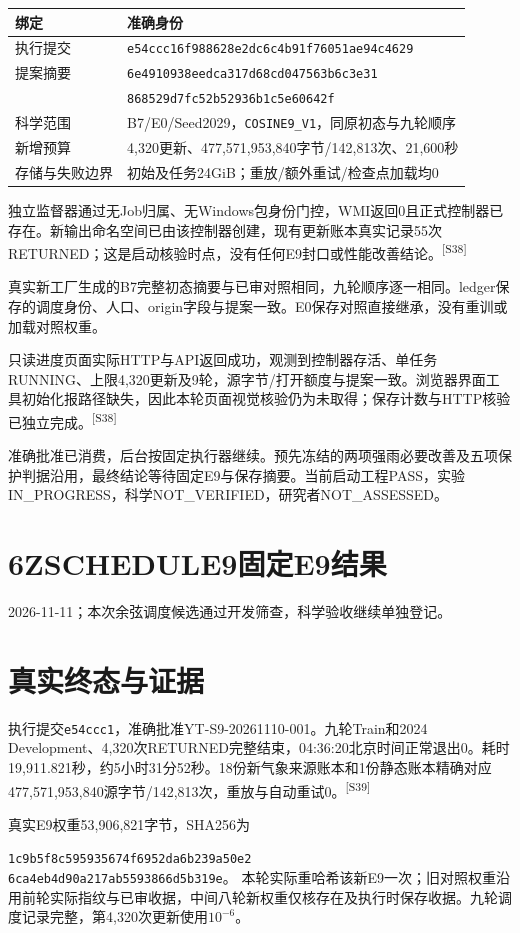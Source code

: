 \documentclass[UTF8,10.5pt,a4paper,fontset=none]{ctexart}
\newcommand{\evi}[1]{\textsuperscript{\color{muted}[#1]}}
\newcommand{\pageheading}[2]{\clearpage\section*{#1}\textcolor{muted}{#2}\par\vspace{3pt}}
\begin{document}
\begin{tabularx}{\textwidth}{@{}p{34mm}X@{}}
\toprule 绑定 & 准确身份\\\midrule
执行提交 & \texttt{e54ccc16f988628e2dc6c4b91f76051ae94c4629}\\
提案摘要 & \texttt{6e4910938eedca317d68cd047563b6c3e31}\\
 & \texttt{868529d7fc52b52936b1c5e60642f}\\
科学范围 & B7/E0/Seed2029，\texttt{COSINE9\_V1}，同原初态与九轮顺序\\
新增预算 & 4,320更新、477,571,953,840字节/142,813次、21,600秒\\
存储与失败边界 & 初始及任务24GiB；重放/额外重试/检查点加载均0\\
\bottomrule
\end{tabularx}

独立监督器通过无Job归属、无Windows包身份门控，WMI返回0且正式控制器已存在。新输出命名空间已由该控制器创建，现有更新账本真实记录55次RETURNED；这是启动核验时点，没有任何E9封口或性能改善结论。\evi{S38}

真实新工厂生成的B7完整初态摘要与已审对照相同，九轮顺序逐一相同。ledger保存的调度身份、人口、origin字段与提案一致。E0保存对照直接继承，没有重训或加载对照权重。

只读进度页面实际HTTP与API返回成功，观测到控制器存活、单任务RUNNING、上限4,320更新及9轮，源字节/打开额度与提案一致。浏览器界面工具初始化报路径缺失，因此本轮页面视觉核验仍为未取得；保存计数与HTTP核验已独立完成。\evi{S38}

准确批准已消费，后台按固定执行器继续。预先冻结的两项强雨必要改善及五项保护判据沿用，最终结论等待固定E9与保存摘要。当前启动工程PASS，实验IN\_PROGRESS，科学NOT\_VERIFIED，研究者NOT\_ASSESSED。

\pageheading{6Z\quad SCHEDULE9固定E9结果}{2026-11-11；本次余弦调度候选通过开发筛查，科学验收继续单独登记。}
\section*{真实终态与证据}
执行提交\texttt{e54ccc1}，准确批准YT-S9-20261110-001。九轮Train和2024 Development、4,320次RETURNED完整结束，04:36:20北京时间正常退出0。耗时19,911.821秒，约5小时31分52秒。18份新气象来源账本和1份静态账本精确对应477,571,953,840源字节/142,813次，重放与自动重试0。\evi{S39}

真实E9权重53,906,821字节，SHA256为\par
\texttt{1c9b5f8c595935674f6952da6b239a50e2}\\
\texttt{6ca4eb4d90a217ab5593866d5b319e}。
本轮实际重哈希该新E9一次；旧对照权重沿用前轮实际指纹与已审收据，中间八轮新权重仅核存在及执行时保存收据。九轮调度记录完整，第4,320次更新使用$10^{-6}$。
\end{document}
